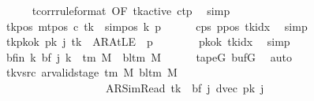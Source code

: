 \begin{isabellebody}
\ \ \ \ \isamarkupfalse%
\ tcorr{\isacharbrackleft}{\kern0pt}rule{\isacharunderscore}{\kern0pt}format{\isacharcomma}{\kern0pt}\ OF\ tk{\isacharunderscore}{\kern0pt}active{\isacharbrackright}{\kern0pt}\ c{\isacharunderscore}{\kern0pt}tp\ \isamarkupfalse%
\ simp\isanewline
\ \ \isamarkupfalse%
\ tk{\isacharunderscore}{\kern0pt}pos{\isacharcolon}{\kern0pt}\ {\isachardoublequoteopen}mt{\isacharunderscore}{\kern0pt}pos\ c\ {\isacharquery}{\kern0pt}tk\ {\isacharequal}{\kern0pt}\ sim{\isacharunderscore}{\kern0pt}pos\ {\isacharquery}{\kern0pt}k\ {\isacharquery}{\kern0pt}p{\isachardoublequoteclose}\isanewline
\ \ \ \ \isamarkupfalse%
\ c{\isacharunderscore}{\kern0pt}ps\ ppos\ tkidx\ \isamarkupfalse%
\ simp\isanewline
\ \ \isamarkupfalse%
\ tk{\isacharunderscore}{\kern0pt}pkok{\isacharcolon}{\kern0pt}\ {\isachardoublequoteopen}{\isacharquery}{\kern0pt}pk\ j\ {\isacharquery}{\kern0pt}tk\ {\isacharequal}{\kern0pt}\ AR{\isacharunderscore}{\kern0pt}AtLE\ {\isasymlongleftrightarrow}\ {\isacharquery}{\kern0pt}p\ {\isacharequal}{\kern0pt}\ {}{\isachardoublequoteclose}\isanewline
\ \ \ \ \isamarkupfalse%
\ pkok\ tkidx\ \isamarkupfalse%
\ simp\isanewline
\ \ \isamarkupfalse%
\ bf{\isacharunderscore}{\kern0pt}in{\isacharcolon}{\kern0pt}\ {\isachardoublequoteopen}{\isasymAnd}k{\isachardot}{\kern0pt}\ {\isacharquery}{\kern0pt}bf\ j\ k\ {\isasymin}\ {\isasymGamma}{\isacharunderscore}{\kern0pt}tm\ M\ {\isasymunion}\ {\isacharbraceleft}{\kern0pt}bl{\isacharunderscore}{\kern0pt}tm\ M{\isacharbraceright}{\kern0pt}{\isachardoublequoteclose}\isanewline
\ \ \ \ \isamarkupfalse%
\ tapeG\ bufG\ \isamarkupfalse%
\ auto\isanewline
\ \ \isamarkupfalse%
\ tk{\isacharunderscore}{\kern0pt}vsrc{\isacharcolon}{\kern0pt}\ {\isachardoublequoteopen}ar{\isacharunderscore}{\kern0pt}valid{\isacharunderscore}{\kern0pt}stage\ {\isacharparenleft}{\kern0pt}{\isasymGamma}{\isacharunderscore}{\kern0pt}tm\ M{\isacharparenright}{\kern0pt}\ {\isacharparenleft}{\kern0pt}bl{\isacharunderscore}{\kern0pt}tm\ M{\isacharparenright}{\kern0pt}\isanewline
\ \ \ \ \ \ \ \ \ \ \ \ \ \ \ \ \ \ \ {\isacharparenleft}{\kern0pt}AR{\isacharunderscore}{\kern0pt}SimRead{\isacharcomma}{\kern0pt}\ {\isacharquery}{\kern0pt}tk{\isacharcomma}{\kern0pt}\ {}{\isacharcomma}{\kern0pt}\ {\isacharquery}{\kern0pt}bf\ j{\isacharcomma}{\kern0pt}\ dvec{\isacharcomma}{\kern0pt}\ {\isacharquery}{\kern0pt}pk\ j{\isacharparenright}{\kern0pt}{\isachardoublequoteclose}\isanewline

\end{isabellebody}
